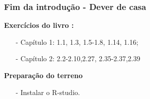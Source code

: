 \documentclass[graphics,14pt]{beamer}
\begin{document}
	\begin{frame}
	\frametitle{Fim da introdução - Dever de casa}
		\textbf{Exercícios do livro \cite{Agresti2018}:}
		\begin{itemize}
			\item[-] Capítulo 1: 1.1, 1.3, 1.5-1.8, 1.14, 1.16;
			\item[-] Capítulo 2: 2.2-2.10,2.27, 2.35-2.37,2.39
		\end{itemize}
		\textbf{Preparação do terreno}
		\begin{itemize}
			\item[-] Instalar o R-studio.
		\end{itemize}	

	\end{frame}   
\end{document}
